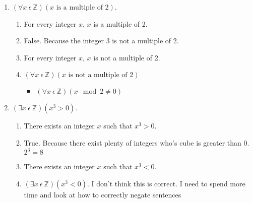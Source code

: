 \documentclass[12pt]{article}
\newenvironment{bgact}[2][Beginning Activity]{\begin{trivlist}
\item[\hskip \labelsep {\bfseries #1}\hskip \labelsep {\bfseries #2.}]}{\end{trivlist}}
\begin{document}
\begin{bgact}{2.5}
\hfill
\begin{enumerate}
\item $(\forall x\ \epsilon\ \mathbb{Z})(x \text{ is a multiple of } 2)$.
    \begin{enumerate}
        \item For every integer $x$, $x$ is a multiple of 2.
        \item False. Because the integer $3$ is not a multiple of 2.
        \item For every integer $x$, $x$ is not a multiple of 2.
        \item $(\forall x\ \epsilon\ \mathbb{Z})(x \text{ is not a multiple of } 2)$
        \begin{itemize}
            \item $(\forall x\ \epsilon\ \mathbb{Z})(x \mod 2 \neq 0)$
        \end{itemize}
    \end{enumerate}
\item $(\exists x\ \epsilon\ \mathbb{Z})(x^3 > 0)$.
    \begin{enumerate}
        \item There exists an integer $x$ such that $x^3 > 0$.
        \item True. Because there exist plenty of integers who's cube is greater than 0. $2^3 = 8$
        \item There exists an integer $x$ such that $x^3 < 0$.
        \item $(\exists x\ \epsilon\ \mathbb{Z})(x^3 < 0)$. I don't think this is correct. I need to spend more time and look at how to correctly negate sentences
    \end{enumerate}
\end{enumerate}

\end{bgact}
\end{document}
